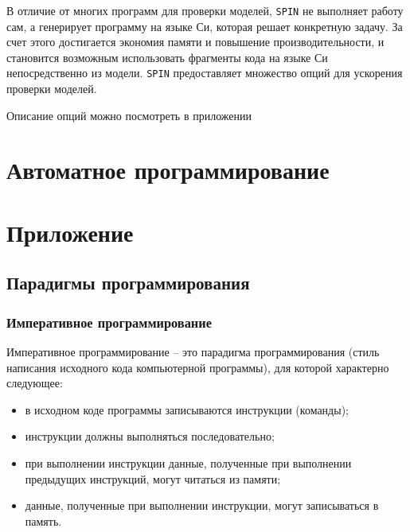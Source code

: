 \documentclass[12pt, twoside]{report}
\begin{document}
В отличие от многих программ для проверки моделей, \texttt{SPIN} не выполняет
работу сам, а генерирует программу на языке Си, которая решает конкретную задачу.
За счет этого достигается экономия памяти и повышение производительности, и становится
возможным использовать фрагменты кода на языке Си непосредственно из модели.
\texttt{SPIN} предоставляет множество опций для ускорения проверки моделей.

Описание опций можно посмотреть в приложении 

\newpage
\chapter*{Автоматное программирование}



\newpage
\chapter*{Приложение}\label{addons}

\section*{Парадигмы программирования}

\subsection*{Императивное программирование}

Императивное программирование -- это парадигма программирования (стиль написания исходного кода компьютерной программы), для которой характерно следующее:

\begin{itemize}
  \item в исходном коде программы записываются инструкции (команды);
  \item инструкции должны выполняться последовательно;
  \item при выполнении инструкции данные, полученные при выполнении предыдущих инструкций, могут читаться из памяти;
  \item данные, полученные при выполнении инструкции, могут записываться в память.
\end{itemize}
\end{document}
